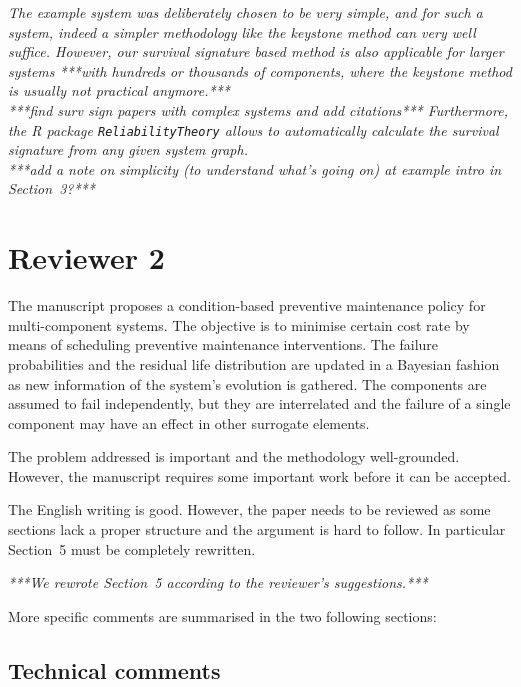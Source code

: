 \documentclass[authoryear]{elsarticle}
\begin{document}
\begin{enumerate}
\emph{The example system was deliberately chosen to be very simple,
and for such a system, indeed a simpler methodology like the keystone method can very well suffice.
However, our survival signature based method is also applicable for larger systems ***with hundreds or thousands of components,
where the keystone method is usually not practical anymore.***\\
***find surv sign papers with complex systems and add citations***
Furthermore, the \textsf{R} package \texttt{ReliabilityTheory} allows to automatically calculate the
survival signature from any given system graph.\\
***add a note on simplicity (to understand what's going on) at example intro in Section~3?***}
\end{enumerate}


\section*{Reviewer 2}

The manuscript proposes a condition-based preventive maintenance policy for multi-component systems. The objective is to minimise certain cost rate by means of scheduling preventive maintenance interventions. The failure probabilities and the residual life distribution are updated in a Bayesian fashion as new information of the system’s evolution is gathered. The components are assumed to fail independently, but they are interrelated and the failure of a single component may have an effect in other surrogate elements.

The problem addressed is important and the methodology well-grounded. However, the manuscript requires some important work before it can be accepted.

The English writing is good. However, the paper needs to be reviewed as some sections lack a proper structure and the argument is hard to follow. In particular Section~5 must be completely rewritten.

\smallskip

\emph{***We rewrote Section~5 according to the reviewer's suggestions.***}

\smallskip

More specific comments are summarised in the two following sections:

\subsection*{Technical comments}
\end{document}

